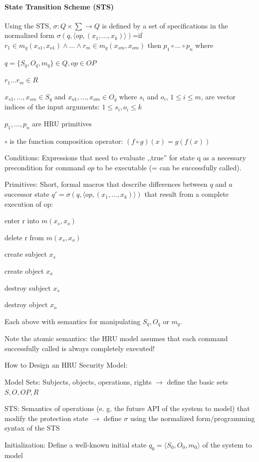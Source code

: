 \documentclass[a4paper]{article}
\begin{document}
\begin{multicols}{3}
    \paragraph{State Transition Scheme (STS)}
    Using the STS, $\sigma:Q\times\sum\rightarrow Q$ is defined by a set of specifications in the normalized form
    $\sigma(q,\langle op,(x_1,\dots ,x_k)\rangle )$=if $r_1\in m_q(x_{s1},x_{o1}) \wedge \dots  \wedge r_m\in m_q(x_{sm},x_{om})$ then $p_1\circ \dots \circ p_n$ where
    \begin{itemize*}
        \item $q=\{S_q,O_q,m_q\}\in Q,op\in OP$
        \item $r_1 \dots r_m\in R$
        \item $x_{s1},\dots ,x_{sm}\in S_q$ and $x_{o1},\dots ,x_{om}\in O_q$ where $s_i$ and $o_i$, $1\leq i\leq m$, are vector indices of the input arguments: $1\leq s_i,o_i\leq k$
        \item $p_1,\dots ,p_n$ are HRU primitives
        \item $\circ$ is the function composition operator: $(f\circ g)(x)=g(f(x))$
    \end{itemize*}

    Conditions: Expressions that need to evaluate ,,true'' for state q as a necessary precondition for command $op$ to be executable (= can be successfully called).

    Primitives: Short, formal macros that describe differences between $q$ and $a$ successor state $q'=\sigma(q,\langle op,(x_1 ,\dots ,x_k)\rangle )$ that result from a complete execution of op:
    \begin{itemize*}
        \item enter r into $m(x_s,x_o)$
        \item delete r from $m(x_s,x_o)$
        \item create subject $x_s$
        \item create object $x_o$
        \item destroy subject $x_s$
        \item destroy object $x_o$
        \item Each above with semantics for manipulating $S_q, O_q$ or $m_q$.
    \end{itemize*}

    Note the atomic semantics: the HRU model assumes that each command successfully called is always completely executed!

    How to Design an HRU Security Model:
    \begin{enumerate*}
        \item Model Sets: Subjects, objects, operations, rights $\rightarrow$ define the basic sets $S,O,OP,R$
        \item STS: Semantics of operations (e. g. the future API of the system to model) that modify the protection state $\rightarrow$ define $\sigma$ using the normalized form/programming syntax of the STS
        \item Initialization: Define a well-known initial state $q_0 =\langle S_0 ,O_0 ,m_0 \rangle$ of the system to model
    \end{enumerate*}


\end{multicols}
\end{document}
